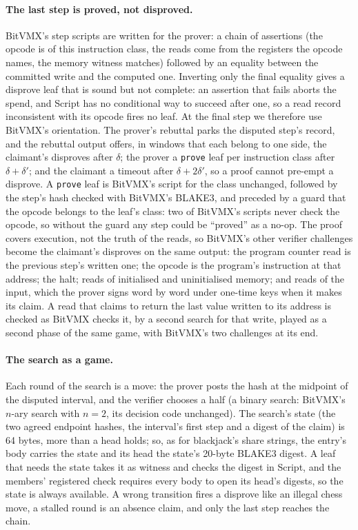 \documentclass[11pt]{article}
\begin{document}
\paragraph{The last step is proved, not disproved.} BitVMX's step
scripts are written for the prover: a chain of assertions (the opcode
is of this instruction class, the reads come from the registers the
opcode names, the memory witness matches) followed by an equality
between the committed write and the computed one. Inverting only the
final equality gives a disprove leaf that is sound but not complete: an
assertion that fails aborts the spend, and Script has no conditional
way to succeed after one, so a read record inconsistent with its opcode
fires no leaf. At the final step we therefore use BitVMX's orientation.
The prover's rebuttal parks the disputed step's record, and the
rebuttal output offers, in windows that each belong to one side, the
claimant's disproves after $\delta$; the prover a \texttt{prove} leaf
per instruction class after $\delta+\delta'$; and the claimant a
timeout after $\delta+2\delta'$, so a proof cannot pre-empt a disprove.
A \texttt{prove} leaf is BitVMX's script for the class unchanged,
followed by the step's hash checked with BitVMX's BLAKE3, and preceded
by a guard that the opcode belongs to the leaf's class: two of BitVMX's
scripts never check the opcode, so without the guard any step could be
``proved'' as a no-op. The proof covers execution, not the truth of
the reads, so BitVMX's other verifier challenges become the claimant's
disproves on the same output: the program counter read is the previous
step's written one; the opcode is the program's instruction at that
address; the halt; reads of initialised and uninitialised memory; and
reads of the input, which the prover signs word by word under one-time
keys when it makes its claim. A read that claims to return the last
value written to its address is checked as BitVMX checks it, by a
second search for that write, played as a second phase of the same
game, with BitVMX's two challenges at its end.

\paragraph{The search as a game.} Each round of the search is a move:
the prover posts the hash at the midpoint of the disputed interval, and
the verifier chooses a half (a binary search: BitVMX's $n$-ary search
with $n = 2$, its decision code unchanged). The search's state (the two
agreed endpoint hashes, the interval's first step and a digest of the
claim) is 64 bytes, more than a head holds; so, as for blackjack's
share strings, the entry's body carries the state and its head the
state's 20-byte BLAKE3 digest. A leaf that needs the state takes it as
witness and checks the digest in Script, and the members' registered
check requires every body to open its head's digests, so the state is
always available. A wrong transition fires a disprove like an illegal
chess move, a stalled round is an absence claim, and only the last step
reaches the chain.
\end{document}
